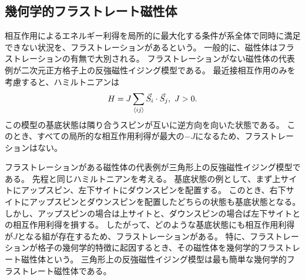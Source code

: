 \documentclass[12pt,titlepage,dvipdfmx]{jarticle}
\begin{document}

%
%
\subsection{幾何学的フラストレート磁性体}
相互作用によるエネルギー利得を局所的に最大化する条件が系全体で同時に満足できない状況を、フラストレーションがあるという。
一般的に、磁性体はフラストレーションの有無で大別される。
フラストレーションがない磁性体の代表例が二次元正方格子上の反強磁性イジング模型である。
最近接相互作用のみを考慮すると、ハミルトニアンは
\begin{align}
   H = J\sum_{\ev{ij}}\vec{S}_i\cdot\vec{S}_j,\ J>0.
\end{align}
この模型の基底状態は隣り合うスピンが互いに逆方向を向いた状態である。
このとき、すべての局所的な相互作用利得が最大の$-J$になるため、フラストレーションはない。

フラストレーションがある磁性体の代表例が三角形上の反強磁性イジング模型である。
先程と同じハミルトニアンを考える。
基底状態の例として、まず上サイトにアップスピン、左下サイトにダウンスピンを配置する。
このとき、右下サイトにアップスピンとダウンスピンを配置したどちらの状態も基底状態となる。
しかし、アップスピンの場合は上サイトと、ダウンスピンの場合ば左下サイトとの相互作用利得を損する。
したがって、どのような基底状態にも相互作用利得が$J$となる組が存在するため、フラストレーションがある。
特に、フラストレーションが格子の幾何学的特徴に起因するとき、その磁性体を幾何学的フラストレート磁性体という。
三角形上の反強磁性イジング模型は最も簡単な幾何学的フラストレート磁性体である。
\end{document}
